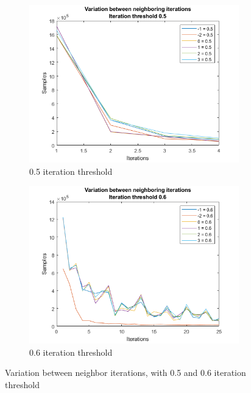 \begin{figure}
    \centering
    \begin{subfigure}[b]{.49\textwidth}
        \centering
        \includegraphics[width=\textwidth]{figures/varneigh-0.5.png}
        \caption{0.5 iteration threshold}
        \label{sfig:iter:varneigh0.5}
    \end{subfigure}
    \hfill
    \begin{subfigure}[b]{.49\textwidth}
        \centering
        \includegraphics[width=\textwidth]{figures/varneigh-0.6.png}
        \caption{0.6 iteration threshold}
        \label{sfig:iter:varneigh0.6}
    \end{subfigure}
    \caption{Variation between neighbor iterations, with 0.5 and 0.6 iteration threshold}
    \label{fig:iter:varneigh0.50.6}
\end{figure}

